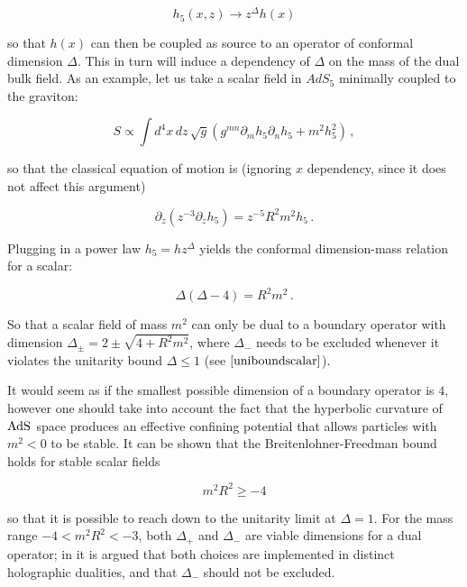 \begin{equation}
	h_5(x,z) \rightarrow z^\Delta h(x)
	\label{}
\end{equation}

so that $h(x)$ can then be coupled as source to an operator of conformal dimension $\Delta$. This in turn will induce a dependency of $\Delta$ on the mass of the dual bulk field. As an example, let us take a scalar field in $AdS_5$ minimally coupled to the graviton:

\begin{equation}
	S \propto \int d^4 x\, dz \, \sqrt g \left( g^{mn} \partial_m h_5 \partial_n h_5 + m^2 h_5^2 \right)\,,
	\label{}
\end{equation}

so that the classical equation of motion is (ignoring $x$ dependency, since it does not affect this argument)

\begin{equation}
	\partial_z \left( z^{-3} \partial_z h_5 \right) = z^{-5} R^2 m^2 h_5 \,.
	\label{ }
\end{equation}

Plugging in a power law $h_5 = h z^\Delta$ yields the conformal dimension-mass relation for a scalar:

\begin{equation}
	\Delta (\Delta-4) = R^2 m^2\,.
	\label{}
\end{equation}

So that a scalar field of mass $m^2$ can only be dual to a boundary operator with dimension $\Delta_{\pm} = 2 \pm \sqrt{4 + R^2 m^2}$, where $\Delta_-$ needs to be excluded whenever it violates the unitarity bound $\Delta \leq 1$ (see $\eqref{uniboundscalar}$).

It would seem as if the smallest possible dimension of a boundary operator is $4$, however one should take into account the fact that the hyperbolic curvature of $\operatorname{AdS}_{}$ space produces an effective confining potential that allows particles with $m^2 < 0$ to be stable. It can be shown\cite{BFbound} that the Breitenlohner-Freedman bound holds for stable scalar fields

\begin{equation}
	m^2 R^2 \geq - 4
	\label{}
\end{equation}

so that it is possible to reach down to the unitarity limit at $\Delta = 1$. For the mass range $-4 < m^2 R^2 < -3$, both $\Delta_+$ and $\Delta_-$ are viable dimensions for a dual operator; in \cite{KW_SB} it is argued that both choices are implemented in distinct holographic dualities, and that $\Delta_-$ should not be excluded.

